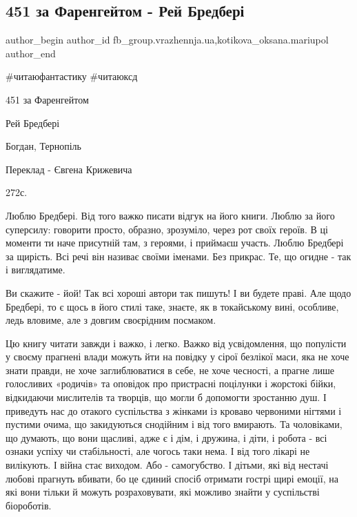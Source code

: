  
 
 
 
 

\subsection{451 за Фаренгейтом - Рей Бредбері}
\label{sec:26_01_2023.fb.fb_group.vrazhennja.ua.1.451_za_farengeitom__}
 
\ifcmt
 author_begin
   author_id fb_group.vrazhennja.ua,kotikova_oksana.mariupol
 author_end
\fi

\#читаюфантастику
\#читаюксд

451 за Фаренгейтом

Рей Бредбері

Богдан, Тернопіль

Переклад - Євгена Крижевича

272с.

Люблю Бредбері. Від того важко писати відгук на його книги. Люблю за його
суперсилу: говорити просто, образно, зрозуміло, через рот своїх героїв. В ці
моменти ти наче присутній там, з героями, і приймаєш участь. Люблю Бредбері за
щирість. Всі речі він називає своїми іменами. Без прикрас. Те, що огидне - так
і виглядатиме.

Ви скажите - йой! Так всі хороші автори так пишуть! І ви будете праві. Але щодо
Бредбері, то є щось в його стилі таке, знаєте, як в токайському вині, особливе,
ледь вловиме, але з довгим своєрідним посмаком.

Цю книгу читати завжди і важко, і легко. Важко від усвідомлення, що популісти у
своєму прагнені влади можуть йти на повідку у сірої безлікої маси, яка не хоче
знати правди, не хоче заглиблюватися в себе, не хоче чесності, а прагне лише
голосливих «родичів» та оповідок про пристрасні поцілунки і жорстокі бійки,
відкидаючи мислителів та творців, що могли б допомогти зростанню душ. І
приведуть нас до отакого суспільства з жінками із кроваво червоними нігтями і
пустими очима, що закидуються снодійним і від того вмирають. Та чоловіками, що
думають, що вони щасливі, адже є і дім, і дружина, і діти, і робота - всі
ознаки успіху чи стабільності, але чогось таки нема. І від того лікарі не
вилікують. І війна стає виходом. Або - самогубство. І дітьми, які від нестачі
любові прагнуть вбивати, бо це єдиний спосіб отримати гострі щирі емоції, на
які вони тільки й можуть розраховувати, які можливо знайти у суспільстві
біороботів.

